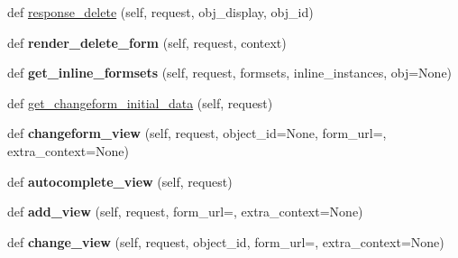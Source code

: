 \begin{DoxyCompactItemize}
\item 
def \mbox{\hyperlink{classdjango_1_1contrib_1_1admin_1_1options_1_1_model_admin_ab16c507ce4a5817f4ea7506a524b896b}{response\+\_\+delete}} (self, request, obj\+\_\+display, obj\+\_\+id)
\item 
\mbox{\label{classdjango_1_1contrib_1_1admin_1_1options_1_1_model_admin_aa6afdb767395f3bdfbbbf4d68391eda7}} 
def {\bfseries render\+\_\+delete\+\_\+form} (self, request, context)
\item 
\mbox{\label{classdjango_1_1contrib_1_1admin_1_1options_1_1_model_admin_a4a80f416a51fcf663dd8ab98eebd706d}} 
def {\bfseries get\+\_\+inline\+\_\+formsets} (self, request, formsets, inline\+\_\+instances, obj=None)
\item 
def \mbox{\hyperlink{classdjango_1_1contrib_1_1admin_1_1options_1_1_model_admin_a0a240a707ea381d1b8ec1579f8955fb7}{get\+\_\+changeform\+\_\+initial\+\_\+data}} (self, request)
\item 
\mbox{\label{classdjango_1_1contrib_1_1admin_1_1options_1_1_model_admin_ad3629c1968a9b9dfe31c1e8b74ab9515}} 
def {\bfseries changeform\+\_\+view} (self, request, object\+\_\+id=None, form\+\_\+url=\textquotesingle{}\textquotesingle{}, extra\+\_\+context=None)
\item 
\mbox{\label{classdjango_1_1contrib_1_1admin_1_1options_1_1_model_admin_ae6a09e6eebf19374dd2096a8fba26500}} 
def {\bfseries autocomplete\+\_\+view} (self, request)
\item 
\mbox{\label{classdjango_1_1contrib_1_1admin_1_1options_1_1_model_admin_aba0feba784a0bc25fdbf1e58d52dfa3b}} 
def {\bfseries add\+\_\+view} (self, request, form\+\_\+url=\textquotesingle{}\textquotesingle{}, extra\+\_\+context=None)
\item 
\mbox{\label{classdjango_1_1contrib_1_1admin_1_1options_1_1_model_admin_a174a8750ea0cd496ebe44fa3df64906b}} 
def {\bfseries change\+\_\+view} (self, request, object\+\_\+id, form\+\_\+url=\textquotesingle{}\textquotesingle{}, extra\+\_\+context=None)

\end{DoxyCompactItemize}
